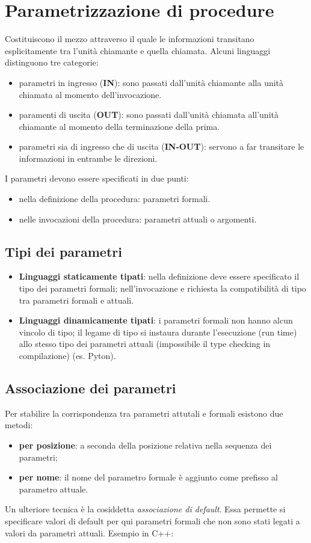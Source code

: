 \documentclass[10pt]{article}
\begin{document}
\section{Parametrizzazione di procedure}
Costituiscono il mezzo attraverso il quale le informazioni transitano esplicitamente tra l'unità chiamante e quella chiamata. Alcuni linguaggi distinguono tre categorie:
\begin{itemize}
    \item parametri in ingresso (\textbf{IN}): sono passati dall'unità chiamante alla unità chiamata al momento dell'invocazione.
    \item paramenti di uscita (\textbf{OUT}): sono passati dall'unità chiamata all'unità chiamante al momento della terminazione della prima.
    \item parametri sia di ingresso che di uscita (\textbf{IN-OUT}): servono a far transitare le informazioni in entrambe le direzioni.
\end{itemize}
I parametri devono essere specificati in due punti:
\begin{itemize}
    \item nella definizione della procedura: parametri formali.
    \item nelle invocazioni della procedura: parametri attuali o argomenti.
\end{itemize}
\subsection{Tipi dei parametri}
\begin{itemize}
    \item \textbf{Linguaggi staticamente tipati}: nella definizione deve essere specificato il tipo dei parametri formali; nell'invocazione e richiesta la compatibilità di tipo tra parametri formali e attuali.
    \item \textbf{Linguaggi dinamicamente tipati}: i parametri formali non hanno alcun vincolo di tipo; il legame di tipo si instaura durante l'esecuzione (run time) allo stesso tipo dei parametri attuali (impossibile il type checking in compilazione) (es. Pyton).
\end{itemize}
\subsection{Associazione dei parametri}
Per stabilire la corrispondenza tra parametri attutali e formali esistono due metodi:
\begin{itemize}
    \item \textbf{per posizione}: a seconda della posizione relativa nella sequenza
dei parametri;
    \item \textbf{per nome}: il nome del parametro formale è aggiunto come prefisso al parametro attuale.
\end{itemize}
Un ulteriore tecnica è la cosiddetta \textit{associazione di default}. Essa permette si specificare valori di default per qui parametri formali che non sono stati legati a valori da parametri attuali. Esempio in C++:
\\
\end{document}
